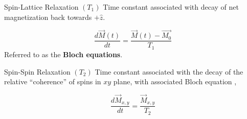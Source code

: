 \documentclass[aspectratio=169,xcolor=dvipsnames]{beamer}
\begin{document}
\begin{frame}{Spin-Lattice Relaxation $(T_1)$}
    Time constant associated with decay of net magnetization back towards $+\hat{z}$. 

    \begin{equation}\label{eqn:bloch-t1}
        \frac{d \vec{M}(t)}{dt} = \frac{\vec{M}(t)-\vec{M_0}}{T_1}
    \end{equation}
    Referred to as the \textbf{Bloch equations}. 
\end{frame}

\begin{frame}{Spin-Spin Relaxation $(T_2)$}
    Time constant associated with the decay of the relative ``coherence'' of spins in $xy$ plane, with associated Bloch equation \cite{principles-resonance},    

    \begin{equation}\label{eqn:bloch-t2}
        \frac{d\vec{M}_{x,y}}{dt} = \frac{\vec{M}_{x,y}}{T_2}
    \end{equation}
\end{frame}
\end{document}
